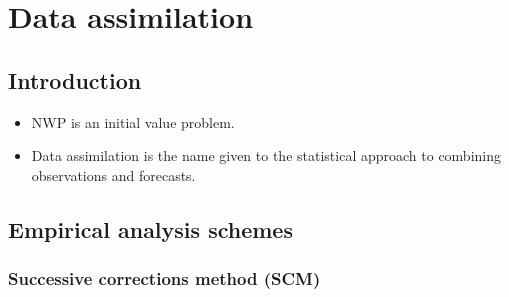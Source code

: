 
\section{Data assimilation}
\label{sec:kalnay:data_assimilation}

\subsection{Introduction}
\label{sub:data_assimilation:intro}

\begin{itemize}
    \item NWP is an initial value problem.
    \item Data assimilation is the name given to the statistical approach to combining observations and forecasts.
\end{itemize}

\subsection{Empirical analysis schemes}
\label{sub:data_assimilation:analysis:empirical}

\subsubsection{Successive corrections method (SCM)}
\label{subs:empirical:scm}

